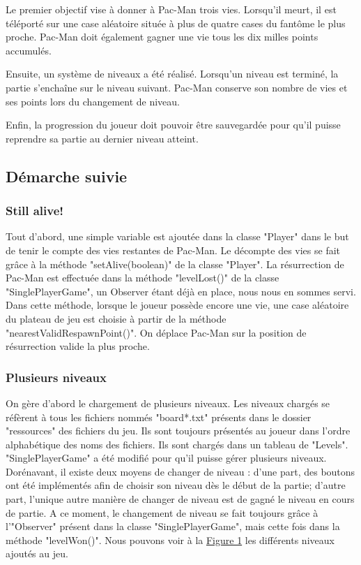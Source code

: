 \documentclass[a4paper,12pt]{report} %
\begin{document}
Le premier objectif vise à donner à Pac-Man trois vies. Lorsqu'il
meurt, il est téléporté sur une case aléatoire située à plus de quatre cases
du fantôme le plus proche. Pac-Man doit également gagner une vie tous
les dix milles points accumulés.

Ensuite, un système de niveaux a été réalisé. Lorsqu'un
niveau est terminé, la partie s'enchaîne sur le niveau suivant. Pac-Man
conserve son nombre de vies et ses points lors du changement de niveau.

Enfin, la progression du joueur doit pouvoir être sauvegardée pour
qu'il puisse reprendre sa partie au dernier niveau atteint.

\subsection{Démarche suivie}
\subsubsection{Still alive!}
Tout d'abord, une simple variable est ajoutée dans la classe "Player"
dans le but de tenir le compte des vies restantes de Pac-Man. Le décompte des
vies se fait grâce à la méthode "setAlive(boolean)" de la classe "Player".
La résurrection de Pac-Man est effectuée dans la méthode "levelLost()" de
la classe "SinglePlayerGame", un Observer étant déjà en place, nous nous en sommes servi. Dans cette méthode, lorsque le joueur possède encore une vie,
une case aléatoire du plateau de jeu est choisie à partir de la méthode "nearestValidRespawnPoint()". On déplace Pac-Man sur la position de résurrection valide la plus proche.

\subsubsection{Plusieurs niveaux}
On gère d'abord le chargement de plusieurs niveaux. Les niveaux chargés
se réfèrent à tous les fichiers nommés "board{*}.txt" présents dans le dossier
"ressources" des fichiers du jeu. Ils sont toujours présentés au joueur
dans l'ordre alphabétique des noms des fichiers. Ils sont chargés dans
un tableau de "Levels". "SinglePlayerGame" a été modifié pour qu'il puisse
gérer plusieurs niveaux. Dorénavant, il existe deux moyens de changer de niveau :
 d'une part, des boutons ont été implémentés afin de choisir son niveau dès le début de la partie; d'autre part, l'unique autre manière de changer de niveau est de gagné le niveau en cours de partie. A ce moment,
le changement de niveau se fait toujours grâce à l'"Observer" présent
dans la classe "SinglePlayerGame", mais cette fois dans la méthode "levelWon()". Nous pouvons voir à la \hyperref[figure1]{Figure 1} les différents niveaux ajoutés au jeu.
\end{document}
